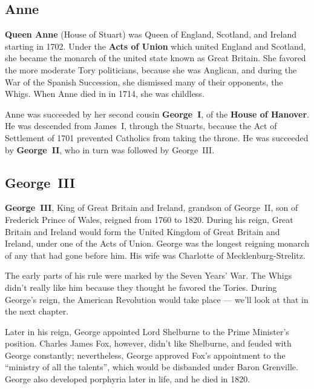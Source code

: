 \subsection*{Anne}

\textbf{Queen Anne} (House of Stuart) was Queen of England, Scotland, and Ireland starting in 1702.
Under the \textbf{Acts of Union} which united England and Scotland,
she became the monarch of the united state known as Great Britain.
She favored the more moderate Tory politicians, because she was Anglican,
and during the War of the Spanish Succession, she dismissed many of their opponents, the Whigs.
When Anne died in in 1714, she was childless.

Anne was succeeded by her second cousin \textbf{George~I}, of the \textbf{House of Hanover}.
He was descended from James~I, through the Stuarts,
because the Act of Settlement of 1701 prevented Catholics from taking the throne.
He was succeeded by \textbf{George~II}, who in turn was followed by George~III\@.


\subsection*{George~III}

\textbf{George~III}, King of Great Britain and Ireland, grandson of George~II, son of Frederick Prince of Wales,
reigned from 1760 to 1820.
During his reign, Great Britain and Ireland would form the United Kingdom of Great Britain and Ireland,
under one of the Acts of Union.
George was the longest reigning monarch of any that had gone before him.
His wife was Charlotte of Mecklenburg-Strelitz.

The early parts of his rule were marked by the Seven Years' War.
The Whigs didn't really like him because they thought he favored the Tories.
During George's reign, the American Revolution would take place --- we'll look at that in the next chapter.

Later in his reign, George appointed Lord Shelburne to the Prime Minister's position.
Charles James Fox, however, didn't like Shelburne, and feuded with George constantly;
nevertheless, George approved Fox's appointment to the ``ministry of all the talents'',
which would be disbanded under Baron Grenville.
George also developed porphyria later in life, and he died in 1820.
